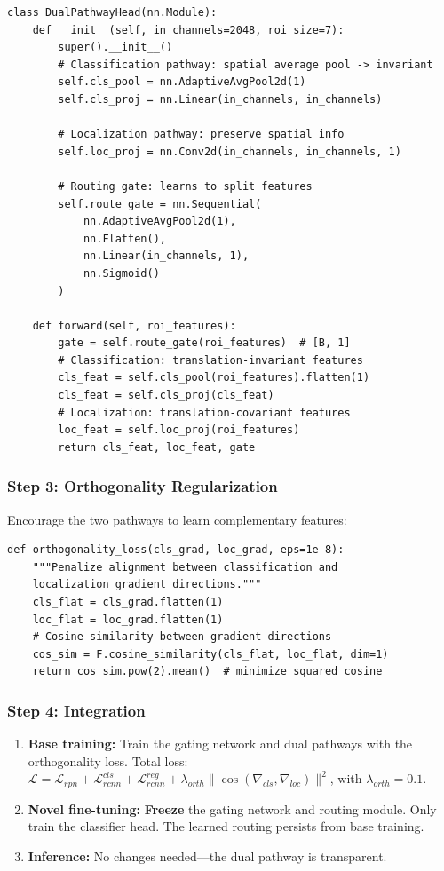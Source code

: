 \documentclass[11pt,a4paper]{article}
\begin{document}
\begin{lstlisting}[caption={Dual-pathway feature routing}]
class DualPathwayHead(nn.Module):
    def __init__(self, in_channels=2048, roi_size=7):
        super().__init__()
        # Classification pathway: spatial average pool -> invariant
        self.cls_pool = nn.AdaptiveAvgPool2d(1)
        self.cls_proj = nn.Linear(in_channels, in_channels)

        # Localization pathway: preserve spatial info
        self.loc_proj = nn.Conv2d(in_channels, in_channels, 1)

        # Routing gate: learns to split features
        self.route_gate = nn.Sequential(
            nn.AdaptiveAvgPool2d(1),
            nn.Flatten(),
            nn.Linear(in_channels, 1),
            nn.Sigmoid()
        )

    def forward(self, roi_features):
        gate = self.route_gate(roi_features)  # [B, 1]
        # Classification: translation-invariant features
        cls_feat = self.cls_pool(roi_features).flatten(1)
        cls_feat = self.cls_proj(cls_feat)
        # Localization: translation-covariant features
        loc_feat = self.loc_proj(roi_features)
        return cls_feat, loc_feat, gate
\end{lstlisting}

\subsubsection{Step 3: Orthogonality Regularization}

Encourage the two pathways to learn complementary features:

\begin{lstlisting}[caption={Orthogonality loss}]
def orthogonality_loss(cls_grad, loc_grad, eps=1e-8):
    """Penalize alignment between classification and
    localization gradient directions."""
    cls_flat = cls_grad.flatten(1)
    loc_flat = loc_grad.flatten(1)
    # Cosine similarity between gradient directions
    cos_sim = F.cosine_similarity(cls_flat, loc_flat, dim=1)
    return cos_sim.pow(2).mean()  # minimize squared cosine
\end{lstlisting}

\subsubsection{Step 4: Integration}

\begin{enumerate}[nosep]
    \item \textbf{Base training:} Train the gating network and dual pathways with the orthogonality loss. Total loss: $\mathcal{L} = \mathcal{L}_{rpn} + \mathcal{L}_{rcnn}^{cls} + \mathcal{L}_{rcnn}^{reg} + \lambda_{orth}\|\cos(\nabla_{cls}, \nabla_{loc})\|^2$, with $\lambda_{orth} = 0.1$.
    \item \textbf{Novel fine-tuning:} \textbf{Freeze} the gating network and routing module. Only train the classifier head. The learned routing persists from base training.
    \item \textbf{Inference:} No changes needed---the dual pathway is transparent.
\end{enumerate}
\end{document}
